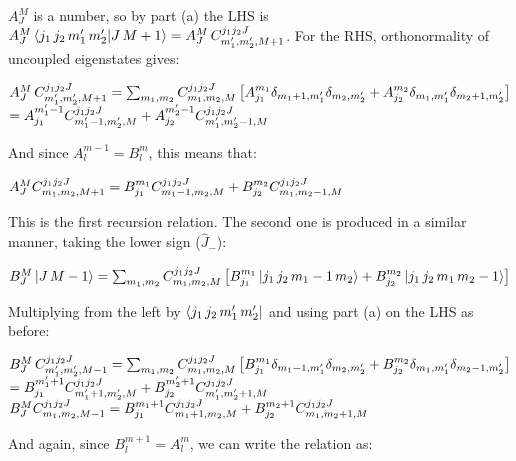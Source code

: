 \documentclass[14pt]{extarticle}
\makeatletter
\newenvironment{lefteqs}{%
    \begin{flushleft}%
    \renewcommand{\arraystretch}{1.3}%
    $\begin{array}{@{}l@{}}%
}{%
    \end{array}$%
    \end{flushleft}%
}
\makeatother
\begin{document}
$A^M_J$ is a number, so by part (a) the LHS is
$A^M_J \braket{j_1 \, j_2 \, m_1' \, m_2' | J \, M+1} = A^M_J \, C^{j_1 j_2 J}_{m_1', m_2', M+1}$.
For the RHS, orthonormality of uncoupled eigenstates gives:

\begin{lefteqs}
    A^M_J \, C^{j_1 j_2 J}_{m_1', m_2', M+1} =
    \sum_{m_1, m_2} C^{j_1 j_2 J}_{m_1, m_2, M}
    \left[ A^{m_1}_{j_1} \delta_{m_1 + 1, m_1'} \delta_{m_2, m_2'} + A^{m_2}_{j_2} \delta_{m_1, m_1'} \delta_{m_2 + 1, m_2'} \right] \\
    = A^{m_1'-1}_{j_1} C^{j_1 j_2 J}_{m_1'-1, m_2', M} + A^{m_2'-1}_{j_2} C^{j_1 j_2 J}_{m_1', m_2'-1, M}
\end{lefteqs}

And since $A^{m-1}_l = B^m_l$, this means that:

\begin{lefteqs}
    A^M_J C^{j_1 j_2 J}_{m_1, m_2, M+1} = B^{m_1}_{j_1} C^{j_1 j_2 J}_{m_1 - 1, m_2, M} + B^{m_2}_{j_2} C^{j_1 j_2 J}_{m_1, m_2 - 1, M}
\end{lefteqs}

This is the first recursion relation. The second one is produced in a similar manner, taking the lower sign ($\hat{J}_-$):

\begin{lefteqs}
    B^M_J \ket{J \, M-1} = \sum_{m_1, m_2} C^{j_1 j_2 J}_{m_1, m_2, M}
    \left[B^{m_1}_{j_1} \ket{j_1 \, j_2 \, m_1-1 \, m_2} + B^{m_2}_{j_2} \ket{j_1 \, j_2 \, m_1 \, m_2-1}  \right]
\end{lefteqs}

Multiplying from the left by $\bra{j_1 \, j_2 \, m_1' \, m_2'}$ and using part (a) on the LHS as before:

\begin{lefteqs}
    B^M_J \, C^{j_1 j_2 J}_{m_1', m_2', M-1} =
    \sum_{m_1, m_2} C^{j_1 j_2 J}_{m_1, m_2, M} \left[B^{m_1}_{j_1} \delta_{m_1-1, m_1'} \delta_{m_2, m_2'} + B^{m_2}_{j_2} \delta_{m_1, m_1'} \delta_{m_2-1, m_2'} \right] \\
    = B^{m_1'+1}_{j_1} C^{j_1 j_2 J}_{m_1'+1, m_2', M} + B^{m_2'+1}_{j_2} C^{j_1 j_2 J}_{m_1', m_2'+1, M} \\
    B^M_J C^{j_1 j_2 J}_{m_1, m_2, M-1} = B^{m_1+1}_{j_1} C^{j_1 j_2 J}_{m_1+1, m_2, M} + B^{m_2+1}_{j_2} C^{j_1 j_2 J}_{m_1, m_2+1, M}
\end{lefteqs}

And again, since $B^{m+1}_l = A^m_l$, we can write the relation as:
\end{document}
